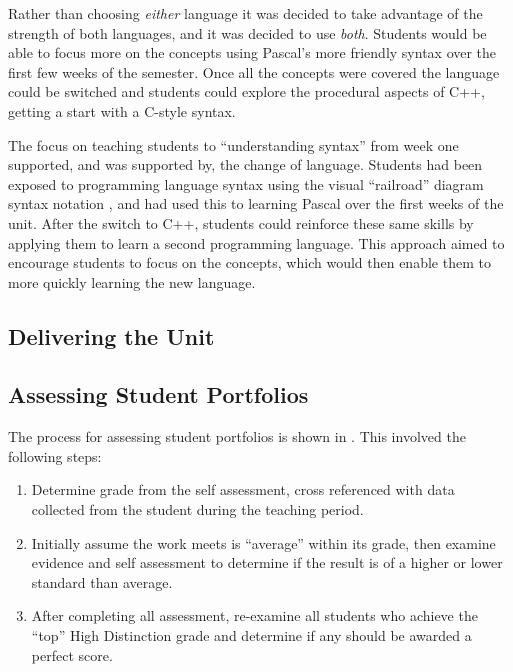 Rather than choosing \emph{either} language it was decided to take advantage of the strength of both languages, and it was decided to use \emph{both}. Students would be able to focus more on the concepts using Pascal's more friendly syntax over the first few weeks of the semester. Once all the concepts were covered the language could be switched and students could explore the procedural aspects of C++, getting a start with a C-style syntax.

The focus on teaching students to ``understanding syntax'' from week one supported, and was supported by, the change of language. Students had been exposed to programming language syntax using the visual ``railroad'' diagram syntax notation \cite{Braz:1990}, and had used this to learning Pascal over the first weeks of the unit. After the switch to C++, students could reinforce these same skills by applying them to learn a second programming language. This approach aimed to encourage students to focus on the concepts, which would then enable them to more quickly learning the new language.




\subsection{Delivering the Unit} %
\label{sub:delivering_the_unit}





\subsection{Assessing Student Portfolios} %
\label{sub:assessing_student_portfolios}

The process for assessing student portfolios is shown in . This involved the following steps:

\begin{enumerate}
	\item Determine grade from the self assessment, cross referenced with data collected from the student during the teaching period.
	\item Initially assume the work meets is ``average'' within its grade, then examine evidence and self assessment to determine if the result is of a higher or lower standard than average.
	\item After completing all assessment, re-examine all students who achieve the ``top'' High Distinction grade and determine if any should be awarded a perfect score.
\end{enumerate}

